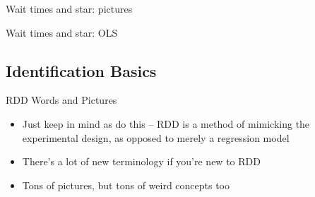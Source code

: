 \documentclass{beamer}
\begin{document}
\begin{frame}{Wait times and star: pictures}
	
	\begin{figure}
	\end{figure}

	
\end{frame}


\begin{frame}{Wait times and star: OLS}
	
	\begin{figure}
	\end{figure}
	
\end{frame}


\subsection{Identification Basics}

\begin{frame}{RDD Words and Pictures}

\begin{itemize}

\item Just keep in mind as do this -- RDD is a method of mimicking the experimental design, as opposed to merely a regression model
\item There's a lot of new terminology if you're new to RDD
\item Tons of pictures, but tons of weird concepts too

\end{itemize}

\end{frame}
\end{document}
